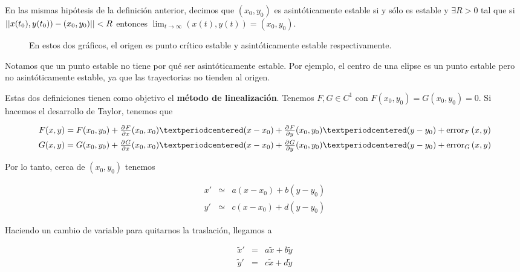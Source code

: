 \begin{definition}

En las mismas hipótesis de la definición anterior, decimos que $(x_0,y_0)$ es asintóticamente estable si y sólo es estable y $∃R>0$ tal que si $||x(t_0), y(t_0)) - (x_0,y_0)|| < R$ entonces $\lim_{t\to ∞} (x(t), y(t)) = (x_0, y_0)$.
\end{definition}

\begin{figure}[hbtp]
\caption{En estos dos gráficos, el origen es punto crítico estable y asintóticamente estable respectivamente.}
\end{figure}

Notamos que un punto estable no tiene por qué ser asintóticamente estable. Por ejemplo, el centro de una elipse es un punto estable pero no asintóticamente estable, ya que las trayectorias no tienden al origen.

Estas dos definiciones tienen como objetivo el \textbf{método de linealización}. Tenemos $F,G∈C^1$ con $F(x_0,y_0) = G(x_0, y_0) = 0$. Si hacemos el desarrollo de Taylor, tenemos que 

\begin{gather*}
F(x,y) = F(x_0, y_0) + \pd{F}{x}(x_0,x_0) · (x-x_0) + \pd{F}{y}(x_0, y_0) · (y-y_0) + \mathrm{error}_F \,(x,y) \\
G(x,y) = G(x_0, y_0) + \pd{G}{x}(x_0,x_0) · (x-x_0) + \pd{G}{y}(x_0, y_0) · (y-y_0)+ \mathrm{error}_G \,(x,y)
\end{gather*}

Por lo tanto, cerca de $(x_0, y_0)$ tenemos 

\begin{equation} \label{eqML_TaylorNoErr}
\begin{matrix}
x' &\simeq&  a(x-x_0) + b(y-y_0) \\
y' &\simeq& c(x-x_0) + d(y-y_0) 
\end{matrix}
\end{equation}

Haciendo un cambio de variable para quitarnos la traslación, llegamos a 

\begin{equation} \label{eqML_Trasl}
\begin{matrix}
\tilde{x}' &=& a\tilde{x} + b \tilde{y} \\
\tilde{y}' &=& c\tilde{x} + d \tilde{y} 
\end{matrix}
\end{equation}


